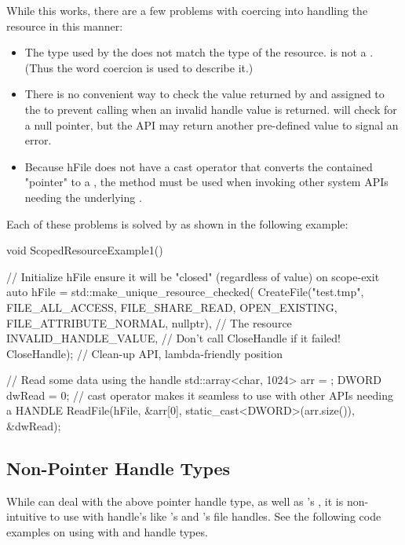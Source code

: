 \documentclass[ebook,11pt,article]{memoir}
\begin{document}
While this works, there are a few problems with coercing  into handling the resource in this manner:
\begin{itemize}
\item The type used by the  does not match the type of the resource.   is not a .  (Thus the word coercion is used to describe it.)
\item There is no convenient way to check the value returned by  and assigned to the  to prevent calling  when an invalid handle value is returned.   will check for a null pointer, but the  API may return another pre-defined value to signal an error.
\item Because hFile does not have a cast operator that converts the contained "pointer" to a , the  method must be used when invoking other system APIs needing the underlying .
\end{itemize}

Each of these problems is solved by  as shown in the following example:

\begin{codeblock}
void ScopedResourceExample1()
{
	// Initialize hFile ensure it will be "closed" (regardless of value) on scope-exit
	auto hFile = std::make_unique_resource_checked(
		CreateFile("test.tmp", 
			FILE_ALL_ACCESS, 
			FILE_SHARE_READ, 
			OPEN_EXISTING, 
			FILE_ATTRIBUTE_NORMAL,
			nullptr),           // The resource
		INVALID_HANDLE_VALUE,   // Don't call CloseHandle if it failed!
		CloseHandle);           // Clean-up API, lambda-friendly position

	// Read some data using the handle
	std::array<char, 1024> arr = { };
	DWORD dwRead = 0;
	// cast operator makes it seamless to use with other APIs needing a HANDLE
	ReadFile(hFile,
		&arr[0], 
		static_cast<DWORD>(arr.size()), 
		&dwRead);
}
\end{codeblock}

\subsection{Non-Pointer Handle Types}
While  can deal with the above pointer handle type, as well as 's , it is non-intuitive to use with handle's like 's and 's  file handles. See the following code examples on using  with  and  handle types.
\end{document}
